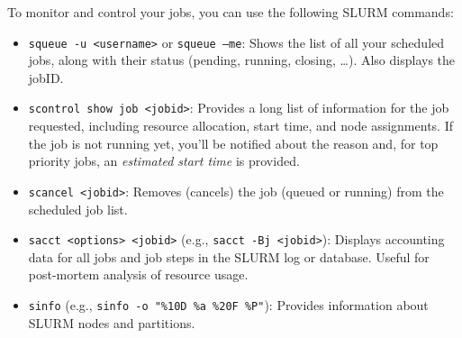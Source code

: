To monitor and control your jobs, you can use the following SLURM commands:

\begin{itemize}
    \item \texttt{squeue -u <username>} or \texttt{squeue --me}: Shows the list of all your scheduled jobs, along with their status (pending, running, closing, \ldots). Also displays the jobID.
    \item \texttt{scontrol show job <jobid>}: Provides a long list of information for the job requested, including resource allocation, start time, and node assignments. If the job is not running yet, you'll be notified about the reason and, for top priority jobs, an \textit{estimated start time} is provided.
    \item \texttt{scancel <jobid>}: Removes (cancels) the job (queued or running) from the scheduled job list.
    \item \texttt{sacct <options> <jobid>} (e.g., \texttt{sacct -Bj <jobid>}): Displays accounting data for all jobs and job steps in the SLURM log or database. Useful for post-mortem analysis of resource usage.
    \item \texttt{sinfo} (e.g., \texttt{sinfo -o "\%10D \%a \%20F \%P"}): Provides information about SLURM nodes and partitions.
\end{itemize}

